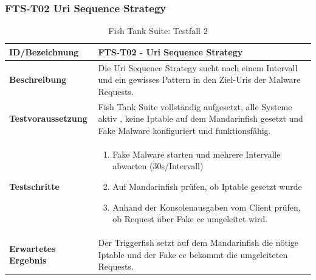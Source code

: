 \begin{table}[H]
	\subsubsection{FTS-T02 Uri Sequence Strategy}
    \centering
	\begin{tabularx}{\textwidth}{| l | p{} |}
        \hline
        \textbf{ID/Bezeichnung} & FTS-T02 - Uri Sequence Strategy\\ \hline
        \textbf{Beschreibung} &  Die Uri Sequence Strategy sucht nach einem Intervall und ein gewisses Pattern in den Ziel-Uris der Malware Requests.\\ \hline  
        \textbf{Testvoraussetzung} &  Fish Tank Suite vollständig aufgesetzt, alle Systeme aktiv , keine Iptable auf dem Mandarinfish gesetzt und Fake Malware konfiguriert und funktionsfähig.\\ \hline      
        \textbf{Testschritte} & \begin{enumerate}
        	\item Fake Malware starten und mehrere Intervalle abwarten (30s/Intervall)
        	\item Auf Mandarinfish prüfen, ob Iptable gesetzt wurde
        	\item Anhand der Konsolenausgaben vom Client prüfen, ob Request über Fake \gls{cc} umgeleitet wird.
        \end{enumerate} \\ \hline    
        \textbf{Erwartetes Ergebnis} & Der Triggerfish setzt auf dem Mandarinfish die nötige Iptable und der Fake \gls{cc} bekommt die umgeleiteten Requests.\\ \hline      
    \end{tabularx}
    \caption{Fish Tank Suite: Testfall 2}
\end{table}



